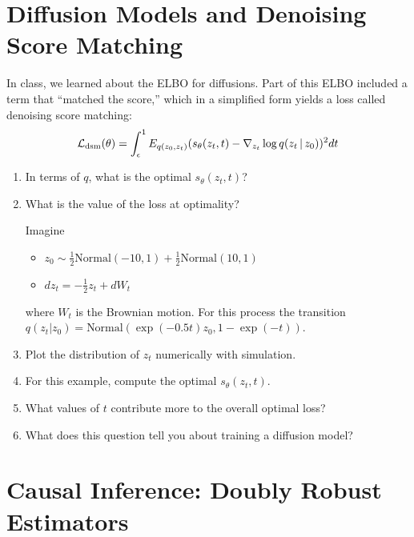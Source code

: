 \documentclass[11pt]{article}
\begin{document}
\newpage

\section{Diffusion Models and Denoising Score Matching}
In class, we learned about the ELBO for diffusions. Part of this ELBO included a term that ``matched the score,'' which in a simplified form %
yields a loss called denoising score matching:
\begin{align*}
    {\cal L}_{\text{dsm}}(\theta) = \int_{\epsilon}^1 E_{q(z_0, z_t)} (s_{\theta}(z_t, t) - \nabla_{z_t} \log q (z_t \,|\, z_0))^2dt
\end{align*}
\begin{enumerate}[label=(\Alph*)]
    \item In terms of $q$, what is the optimal $s_\theta(z_t, t)$?


    \item What is the value of the loss at optimality?


    \noindent Imagine 
    \begin{itemize}
        \item $z_0 \sim \frac{1}{2}\textrm{Normal}(-10, 1) + \frac{1}{2}\textrm{Normal}(10, 1)$
        \item $dz_t = -\frac{1}{2}z_t + dW_t$
    \end{itemize}
    where $W_t$ is the Brownian motion. 
    For this process the transition $q(z_t | z_0) = \text{Normal}(\exp(-0.5 t)z_0, 1 - \exp(-t))$.

    \item Plot the distribution of $z_t$ numerically with simulation. 

    \item For this example, compute the optimal $s_\theta(z_t, t)$.

    \item What values of $t$ contribute more to the overall optimal loss?
   
    \item What does this question tell you about training a diffusion model?
\end{enumerate}

\newpage 

\section{Causal Inference: Doubly Robust Estimators}
\end{document}
